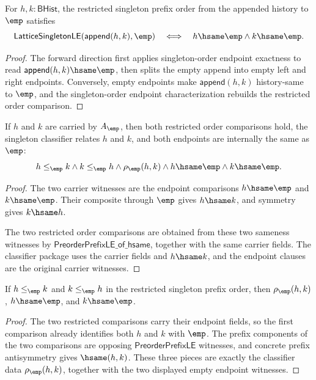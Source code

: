 \begin{theorem}
\label{thm:lattice-singleton-le-append-empty-endpoints}
For $h,k:\mathsf{BHist}$, the restricted singleton prefix order from the
appended history to $\emp$ satisfies
$$
\mathsf{LatticeSingletonLE}(\mathsf{append}(h,k),\emp)
\quad\Longleftrightarrow\quad
h\hsame\emp\land k\hsame\emp.
$$
\end{theorem}
\begin{proof}
The forward direction first applies singleton-order endpoint exactness to read
$\mathsf{append}(h,k)\hsame\emp$, then splits the empty append into empty left
and right endpoints. Conversely, empty endpoints make
$\mathsf{append}(h,k)$ history-same to $\emp$, and the singleton-order endpoint
characterization rebuilds the restricted order comparison.
\end{proof}

\begin{theorem}
\label{thm:lattice-singleton-carrier-order-collapse}
If $h$ and $k$ are carried by $A_{\emp}$, then both restricted order
comparisons hold, the singleton classifier relates $h$ and $k$, and both
endpoints are internally the same as $\emp$:
$$
h\le_{\emp} k\land k\le_{\emp} h\land \rho_{\emp}(h,k)
\land h\hsame\emp\land k\hsame\emp.
$$
\end{theorem}
\begin{proof}
The two carrier witnesses are the endpoint comparisons
$h\hsame\emp$ and $k\hsame\emp$. Their composite through $\emp$ gives
$h\hsame k$, and symmetry gives $k\hsame h$.

The two restricted order comparisons are obtained from these two sameness
witnesses by $\mathsf{PreorderPrefixLE\_of\_hsame}$, together with the same
carrier fields. The classifier package uses the carrier fields and
$h\hsame k$, and the endpoint clauses are the original carrier witnesses.
\end{proof}

\begin{theorem}
\label{thm:lattice-singleton-le-antisymm-classifier}
If $h\le_{\emp} k$ and $k\le_{\emp} h$ in the restricted singleton prefix
order, then $\rho_{\emp}(h,k)$, $h\hsame\emp$, and $k\hsame\emp$.
\end{theorem}
\begin{proof}
The two restricted comparisons carry their endpoint fields, so the first
comparison already identifies both $h$ and $k$ with $\emp$. The prefix
components of the two comparisons are opposing $\mathsf{PreorderPrefixLE}$
witnesses, and concrete prefix antisymmetry gives $\hsame(h,k)$. These three
pieces are exactly the classifier data $\rho_{\emp}(h,k)$, together with the
two displayed empty endpoint witnesses.
\end{proof}

